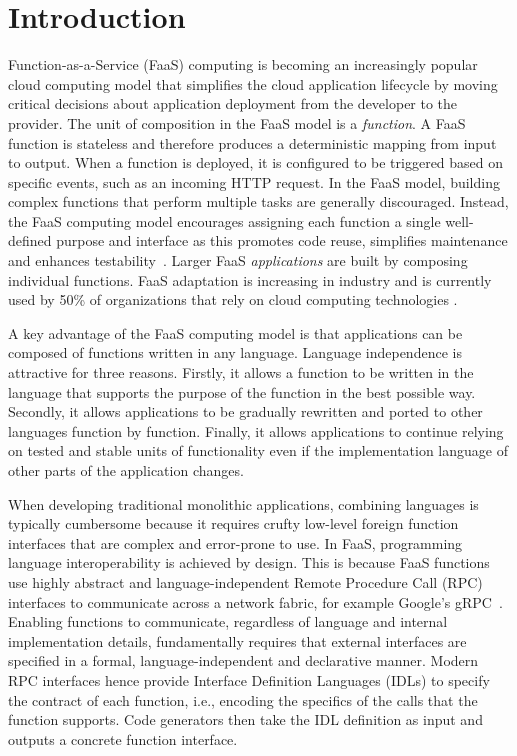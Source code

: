 \section{Introduction}
Function-as-a-Service (FaaS) computing is becoming an increasingly popular cloud computing model that simplifies the cloud application lifecycle by moving critical decisions about application deployment from the developer to the provider. The unit of composition in the FaaS model is a \emph{function}. A FaaS function is stateless and therefore produces a deterministic mapping from input to output. When a function is deployed, it is configured to be triggered based on specific events, such as an incoming HTTP request. In the FaaS model, building complex functions that perform multiple tasks are generally discouraged. Instead, the FaaS computing model encourages assigning each function a single well-defined purpose and interface as this promotes code reuse, simplifies maintenance and enhances testability~\cite{williams16_growin_need_micros_bioin}. Larger FaaS \emph{applications} are built by composing individual functions. FaaS adaptation is increasing in industry and is currently used by 50\% of organizations that rely on cloud computing technologies \cite{serverless_state}.


A key advantage of the FaaS computing model is that applications can be composed of functions written in any language. Language independence is attractive for three reasons. Firstly, it allows a function to be written in the language that supports the purpose of the function in the best possible way. Secondly, it allows applications to be gradually rewritten and ported to other languages function by function. Finally, it allows applications to continue relying on tested and stable units of functionality even if the implementation language of other parts of the application changes.

When developing traditional monolithic applications, combining languages is typically cumbersome because it requires crufty low-level foreign function interfaces that are complex and error-prone to use. In FaaS, programming language interoperability is achieved by design. This is because FaaS functions use highly abstract and language-independent Remote Procedure Call (RPC) interfaces to communicate across a network fabric, for example Google's gRPC~\cite{grpc}. Enabling functions to communicate, regardless of language and internal implementation details, fundamentally requires that external interfaces are specified in a formal, language-independent and declarative manner. Modern RPC interfaces hence provide Interface Definition Languages (IDLs) to specify the contract of each function, i.e., encoding the specifics of the calls that the function supports. Code generators then take the IDL definition as input and outputs a concrete function interface.

